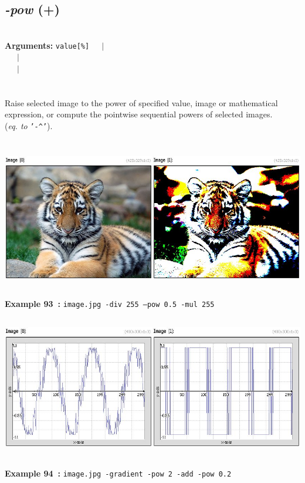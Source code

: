 \documentclass[a4paper,11pt,twoside]{book}
\begin{document}
\subsection{\emph{-pow} (+)}\vspace*{-0.5em}
~\\\textbf{Arguments: } 
{\small \texttt{value[\%]}}~~~$|$\\
\hspace*{2.2cm}{\small \texttt{[image]}}~~~$|$\\
~~~$|$\\
\\~\\
Raise selected image to the power of specified value, image or mathematical
expression, or compute the pointwise sequential powers of selected images.
~\\(\emph{eq. to} {\small \texttt{'-\textasciicircum '}}).
\begin{center}\includegraphics[keepaspectratio=true,height=7cm,width=\textwidth]{img/gmic_def93.jpg}\\
{\footnotesize \textbf{Example 93~:} \texttt{image.jpg -div 255 --pow 0.5 -mul 255}}
\\\includegraphics[keepaspectratio=true,height=7cm,width=\textwidth]{img/gmic_def94.jpg}\\
{\footnotesize \textbf{Example 94~:} \texttt{image.jpg -gradient -pow 2 -add -pow 0.2}}
\end{center}
\end{document}
